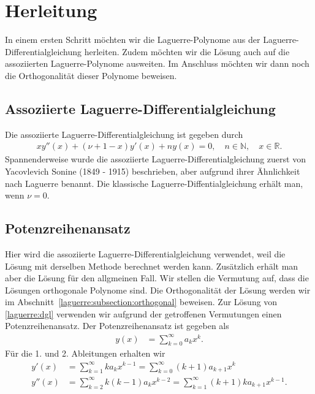 %
%
%
\section{Herleitung%
\label{laguerre:section:definition}}
%
In einem ersten Schritt möchten wir die Laguerre-Polynome
aus der Laguerre-\-Differentialgleichung herleiten.
Zudem möchten wir die Lösung auch auf 
die assoziierten Laguerre-Polynome ausweiten.
Im Anschluss möchten wir dann noch die Orthogonalität dieser Polynome beweisen.

\subsection{Assoziierte Laguerre-Differentialgleichung}
Die assoziierte Laguerre-Differentialgleichung ist gegeben durch
\begin{align}
x y''(x) + (\nu + 1 - x) y'(x) + n y(x)
=
0
, \quad
n \in \mathbb{N}
, \quad
x \in \mathbb{R}
\label{laguerre:dgl}
.
\end{align}
Spannenderweise wurde die assoziierte Laguerre-Differentialgleichung
zuerst von Yacovlevich Sonine (1849 - 1915) beschrieben,
aber aufgrund ihrer Ähnlichkeit nach Laguerre benannt.
Die klassische Laguerre-Diffentialgleichung erhält man, wenn $\nu = 0$.

{\subsection{Potenzreihenansatz}
\label{laguerre:subsection:potenzreihenansatz}}
Hier wird die assoziierte Laguerre-Differentialgleichung verwendet,
weil die Lösung mit derselben Methode berechnet werden kann.
Zusätzlich erhält man aber die Lösung für den allgmeinen Fall.
Wir stellen die Vermutung auf,
dass die Lösungen orthogonale Polynome sind.
Die Orthogonalität der Lösung werden wir im 
Abschnitt~\ref{laguerre:subsection:orthogonal} beweisen.
Zur Lösung von \eqref{laguerre:dgl} verwenden wir aufgrund
der getroffenen Vermutungen einen Potenzreihenansatz.
Der Potenzreihenansatz ist gegeben als
\begin{align*}
y(x)
& =
\sum_{k=0}^\infty a_k x^k
.
\end{align*}
Für die 1. und 2. Ableitungen erhalten wir
\begin{align*}
y'(x)
& =
\sum_{k=1}^\infty k a_k x^{k-1}
=
\sum_{k=0}^\infty (k+1) a_{k+1} x^k
\\
y''(x)
& =
\sum_{k=2}^\infty k (k-1) a_k x^{k-2}
=
\sum_{k=1}^\infty (k+1) k a_{k+1} x^{k-1}
.
\end{align*}


